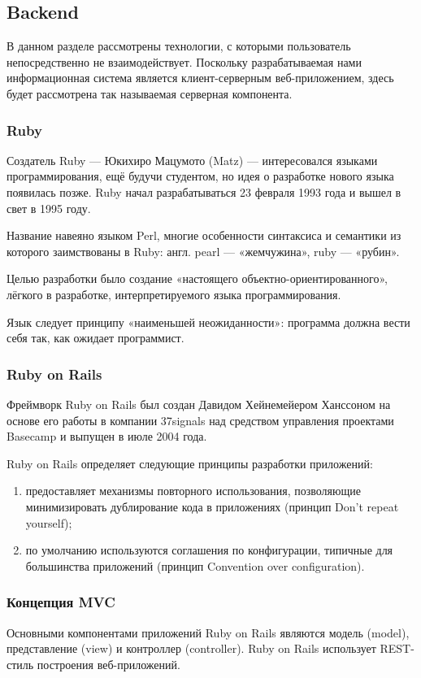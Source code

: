 \subsection{Backend}
В данном разделе рассмотрены технологии, с которыми пользователь непосредственно
не взаимодействует. Поскольку разрабатываемая нами информационная система
является клиент-серверным веб-приложением, здесь будет рассмотрена так
называемая серверная компонента.

\subsubsection{Ruby}
Создатель Ruby — Юкихиро Мацумото (Matz) — интересовался языками
программирования, ещё будучи студентом, но идея о разработке нового языка
появилась позже. Ruby начал разрабатываться 23 февраля 1993 года и вышел в свет
в 1995 году.

Название навеяно языком Perl, многие особенности синтаксиса и семантики из
которого заимствованы в Ruby: англ. pearl — «жемчужина», ruby — «рубин».

Целью разработки было создание «настоящего объектно-ориентированного», лёгкого в
разработке, интерпретируемого языка программирования.

Язык следует принципу «наименьшей неожиданности»: программа должна вести себя
так, как ожидает программист.

\subsubsection{Ruby on Rails}
Фреймворк Ruby on Rails был создан Давидом Хейнемейером Ханссоном на основе его
работы в компании 37signals над средством управления проектами Basecamp и
выпущен в июле 2004 года.

Ruby on Rails определяет следующие принципы разработки приложений:

\begin{enumerate}
  \item предоставляет механизмы повторного использования, 
позволяющие минимизировать дублирование кода в приложениях (принцип Don’t repeat yourself);
  \item по умолчанию используются соглашения по конфигурации, типичные для
большинства приложений (принцип Convention over configuration).
\end{enumerate}

\subsubsection{Концепция MVC}
Основными компонентами приложений Ruby on Rails являются модель (model),
представление (view) и контроллер (controller). Ruby on Rails использует
REST-стиль построения веб-приложений.

